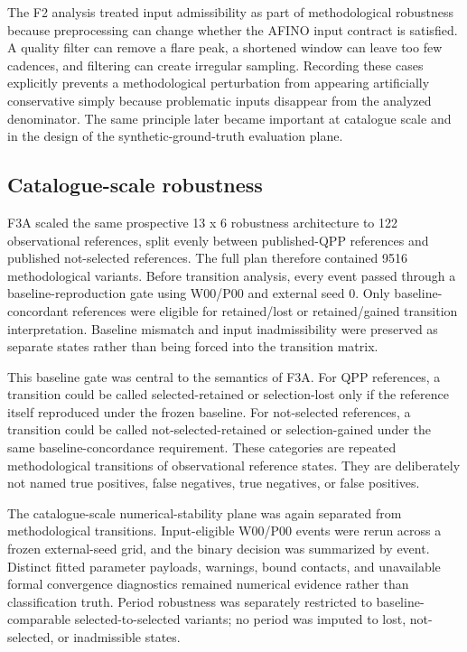 \documentclass[11pt,a4paper]{article}
\begin{document}
The F2 analysis treated input admissibility as part of methodological robustness because preprocessing can change whether the AFINO input contract is satisfied. A quality filter can remove a flare peak, a shortened window can leave too few cadences, and filtering can create irregular sampling. Recording these cases explicitly prevents a methodological perturbation from appearing artificially conservative simply because problematic inputs disappear from the analyzed denominator. The same principle later became important at catalogue scale and in the design of the synthetic-ground-truth evaluation plane.

\subsection{Catalogue-scale robustness}
F3A scaled the same prospective 13 x 6 robustness architecture to 122 observational references, split evenly between published-QPP references and published not-selected references. The full plan therefore contained 9516 methodological variants. Before transition analysis, every event passed through a baseline-reproduction gate using W00/P00 and external seed 0. Only baseline-concordant references were eligible for retained/lost or retained/gained transition interpretation. Baseline mismatch and input inadmissibility were preserved as separate states rather than being forced into the transition matrix.

This baseline gate was central to the semantics of F3A. For QPP references, a transition could be called selected-retained or selection-lost only if the reference itself reproduced under the frozen baseline. For not-selected references, a transition could be called not-selected-retained or selection-gained under the same baseline-concordance requirement. These categories are repeated methodological transitions of observational reference states. They are deliberately not named true positives, false negatives, true negatives, or false positives.

The catalogue-scale numerical-stability plane was again separated from methodological transitions. Input-eligible W00/P00 events were rerun across a frozen external-seed grid, and the binary decision was summarized by event. Distinct fitted parameter payloads, warnings, bound contacts, and unavailable formal convergence diagnostics remained numerical evidence rather than classification truth. Period robustness was separately restricted to baseline-comparable selected-to-selected variants; no period was imputed to lost, not-selected, or inadmissible states.
\end{document}
